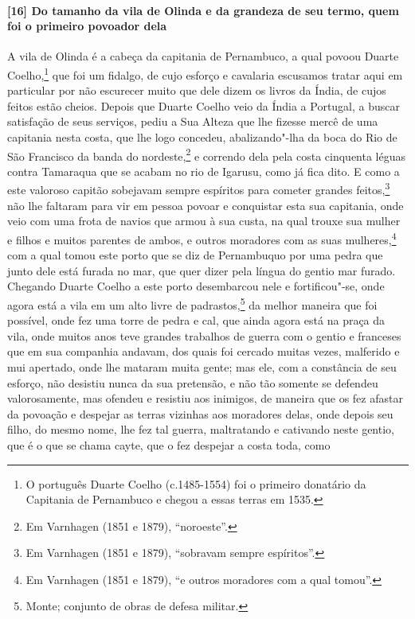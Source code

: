 \paragraph{[16] Do tamanho da vila de Olinda e da grandeza de seu termo, quem foi o primeiro
povoador dela} \quad
A vila de Olinda é a cabeça da capitania de Pernambuco, a qual povoou Duarte
Coelho,\footnote{ O português Duarte Coelho (c.1485-1554) foi o primeiro donatário da
Capitania de Pernambuco e chegou a essas terras em 1535.} que foi um fidalgo, de cujo
esforço e cavalaria escusamos tratar aqui em particular por não escurecer muito que dele
dizem os livros da Índia, de cujos feitos estão cheios. Depois que Duarte Coelho veio da
Índia a Portugal, a buscar satisfação de seus serviços, pediu a Sua Alteza que lhe fizesse
mercê de uma capitania nesta costa, que lhe logo concedeu, abalizando"-lha da boca do Rio
de São Francisco da banda do nordeste,\footnote{ Em Varnhagen (1851 e 1879),
``noroeste''.} e correndo dela pela costa cinquenta léguas contra Tamaraqua que se acabam
no rio de Igarusu, como já fica dito. E como a este valoroso capitão sobejavam sempre
espíritos para cometer grandes feitos,\footnote{ Em Varnhagen (1851 e 1879), ``sobravam
sempre espíritos''.} não lhe faltaram para vir em pessoa povoar e conquistar esta sua
capitania, onde veio com uma frota de navios que armou à sua custa, na qual trouxe sua
mulher e filhos e muitos parentes de ambos, e outros moradores com as suas
mulheres,\footnote{ Em Varnhagen (1851 e 1879), ``e outros moradores com a qual tomou''.}
com a qual tomou este porto que se diz de Pernambuquo por uma pedra que junto dele está
furada no mar, que quer dizer pela língua do gentio mar furado. Chegando Duarte Coelho a
este porto desembarcou nele e fortificou"-se, onde agora está a vila em um alto livre de
padrastos,\footnote{ Monte; conjunto de obras de defesa militar.} da melhor maneira que
foi possível, onde fez uma torre de pedra e cal, que ainda agora está na praça da vila,
onde muitos anos teve grandes trabalhos de guerra com o gentio e franceses que em sua
companhia andavam, dos quais foi cercado muitas vezes, malferido e mui apertado, onde lhe
mataram muita gente; mas ele, com a constância de seu esforço, não desistiu nunca da sua
pretensão, e não tão somente se defendeu valorosamente, mas ofendeu e resistiu aos
inimigos, de maneira que os fez afastar da povoação e despejar as terras vizinhas aos
moradores delas, onde depois seu filho, do mesmo nome, lhe fez tal guerra, maltratando e
cativando neste gentio, que é o que se chama cayte, que o fez despejar a costa toda, como
